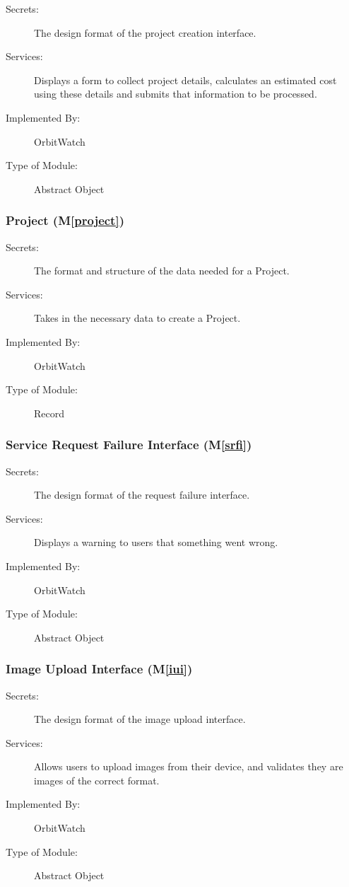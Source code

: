 \documentclass[12pt, titlepage]{article}
\newcommand{\mref}[1]{M\ref{#1}}
\begin{document}
\begin{description}
\item[Secrets:]The design format of the project creation interface.
\item[Services:] Displays a form to collect project details, calculates an estimated cost using these details and submits that information to be processed.
\item[Implemented By:] OrbitWatch
\item[Type of Module:] Abstract Object
\end{description}

\subsubsection{Project (\mref{project})}

\begin{description}
\item[Secrets:]The format and structure of the data needed for a Project.
\item[Services:] Takes in the necessary data to create a Project.
\item[Implemented By:] OrbitWatch
\item[Type of Module:] Record
\end{description}

\subsubsection{Service Request Failure Interface (\mref{srfi})}

\begin{description}
\item[Secrets:]The design format of the request failure interface.
\item[Services:] Displays a warning to users that something went wrong.
\item[Implemented By:] OrbitWatch
\item[Type of Module:] Abstract Object
\end{description}

\subsubsection{Image Upload Interface (\mref{iui})}

\begin{description}
\item[Secrets:]The design format of the image upload interface.
\item[Services:] Allows users to upload images from their device, and validates they are images of the correct format.
\item[Implemented By:] OrbitWatch
\item[Type of Module:] Abstract Object
\end{description}
\end{document}
